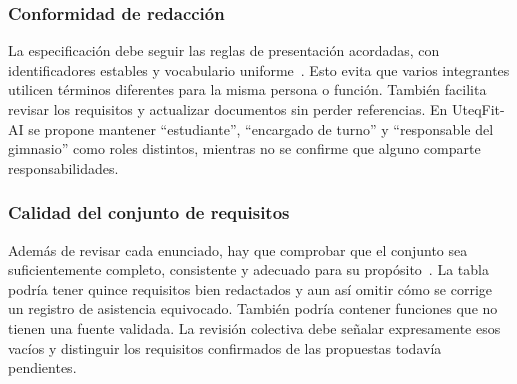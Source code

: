 \subsubsection{Conformidad de redacción}
La especificación debe seguir las reglas de presentación acordadas, con identificadores estables y vocabulario uniforme~\cite{ieee29148}. Esto evita que varios integrantes utilicen términos diferentes para la misma persona o función. También facilita revisar los requisitos y actualizar documentos sin perder referencias. En UteqFit-AI se propone mantener ``estudiante'', ``encargado de turno'' y ``responsable del gimnasio'' como roles distintos, mientras no se confirme que alguno comparte responsabilidades.

\subsubsection{Calidad del conjunto de requisitos}
Además de revisar cada enunciado, hay que comprobar que el conjunto sea suficientemente completo, consistente y adecuado para su propósito~\cite{ieee29148}. La tabla podría tener quince requisitos bien redactados y aun así omitir cómo se corrige un registro de asistencia equivocado. También podría contener funciones que no tienen una fuente validada. La revisión colectiva debe señalar expresamente esos vacíos y distinguir los requisitos confirmados de las propuestas todavía pendientes.
